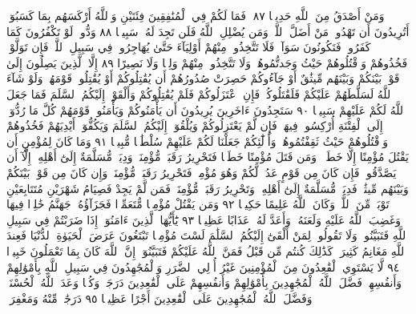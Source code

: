 وَمَنْ أَصْدَقُ مِنَ ٱللَّهِ حَدِيثࣰا ٨٧۞ فَمَا لَكُمْ فِي ٱلْمُنَٰفِقِينَ
فِئَتَيْنِ وَٱللَّهُ أَرْكَسَهُم بِمَا كَسَبُوٓا۟ۚ أَتُرِيدُونَ أَن تَهْدُوا۟ مَنْ
أَضَلَّ ٱللَّهُۖ وَمَن يُضْلِلِ ٱللَّهُ فَلَن تَجِدَ لَهُۥ سَبِيلࣰا ٨٨ وَدُّوا۟ لَوْ تَكْفُرُونَ
كَمَا كَفَرُوا۟ فَتَكُونُونَ سَوَآءࣰۖ فَلَا تَتَّخِذُوا۟ مِنْهُمْ أَوْلِيَآءَ حَتَّىٰ
يُهَاجِرُوا۟ فِي سَبِيلِ ٱللَّهِۚ فَإِن تَوَلَّوْا۟ فَخُذُوهُمْ وَٱقْتُلُوهُمْ حَيْثُ
وَجَدتُّمُوهُمْۖ وَلَا تَتَّخِذُوا۟ مِنْهُمْ وَلِيࣰّا وَلَا نَصِيرًا ٨٩ إِلَّا ٱلَّذِينَ
يَصِلُونَ إِلَىٰ قَوْمِۭ بَيْنَكُمْ وَبَيْنَهُم مِّيثَٰقٌ أَوْ جَآءُوكُمْ حَصِرَتْ
صُدُورُهُمْ أَن يُقَٰتِلُوكُمْ أَوْ يُقَٰتِلُوا۟ قَوْمَهُمْۚ وَلَوْ شَآءَ ٱللَّهُ
لَسَلَّطَهُمْ عَلَيْكُمْ فَلَقَٰتَلُوكُمْۚ فَإِنِ ٱعْتَزَلُوكُمْ فَلَمْ يُقَٰتِلُوكُمْ
وَأَلْقَوْا۟ إِلَيْكُمُ ٱلسَّلَمَ فَمَا جَعَلَ ٱللَّهُ لَكُمْ عَلَيْهِمْ سَبِيلࣰا ٩٠
سَتَجِدُونَ ءَاخَرِينَ يُرِيدُونَ أَن يَأْمَنُوكُمْ وَيَأْمَنُوا۟ قَوْمَهُمْ كُلَّ
مَا رُدُّوٓا۟ إِلَى ٱلْفِتْنَةِ أُرْكِسُوا۟ فِيهَاۚ فَإِن لَّمْ يَعْتَزِلُوكُمْ وَيُلْقُوٓا۟
إِلَيْكُمُ ٱلسَّلَمَ وَيَكُفُّوٓا۟ أَيْدِيَهُمْ فَخُذُوهُمْ وَٱقْتُلُوهُمْ حَيْثُ
ثَقِفْتُمُوهُمْۚ وَأُو۟لَٰٓئِكُمْ جَعَلْنَا لَكُمْ عَلَيْهِمْ سُلْطَٰنࣰا مُّبِينࣰا ٩١
وَمَا كَانَ لِمُؤْمِنٍ أَن يَقْتُلَ مُؤْمِنًا إِلَّا خَطَـࣰٔاۚ وَمَن قَتَلَ
مُؤْمِنًا خَطَـࣰٔا فَتَحْرِيرُ رَقَبَةࣲ مُّؤْمِنَةࣲ وَدِيَةࣱ مُّسَلَّمَةٌ
إِلَىٰٓ أَهْلِهِۦٓ إِلَّآ أَن يَصَّدَّقُوا۟ۚ فَإِن كَانَ مِن قَوْمٍ عَدُوࣲّ
لَّكُمْ وَهُوَ مُؤْمِنࣱ فَتَحْرِيرُ رَقَبَةࣲ مُّؤْمِنَةࣲۖ وَإِن كَانَ
مِن قَوْمِۭ بَيْنَكُمْ وَبَيْنَهُم مِّيثَٰقࣱ فَدِيَةࣱ مُّسَلَّمَةٌ إِلَىٰٓ
أَهْلِهِۦ وَتَحْرِيرُ رَقَبَةࣲ مُّؤْمِنَةࣲۖ فَمَن لَّمْ يَجِدْ فَصِيَامُ
شَهْرَيْنِ مُتَتَابِعَيْنِ تَوْبَةࣰ مِّنَ ٱللَّهِۗ وَكَانَ ٱللَّهُ
عَلِيمًا حَكِيمࣰا ٩٢ وَمَن يَقْتُلْ مُؤْمِنࣰا مُّتَعَمِّدࣰا
فَجَزَآؤُهُۥ جَهَنَّمُ خَٰلِدࣰا فِيهَا وَغَضِبَ ٱللَّهُ عَلَيْهِ
وَلَعَنَهُۥ وَأَعَدَّ لَهُۥ عَذَابًا عَظِيمࣰا ٩٣ يَٰٓأَيُّهَا ٱلَّذِينَ
ءَامَنُوٓا۟ إِذَا ضَرَبْتُمْ فِي سَبِيلِ ٱللَّهِ فَتَبَيَّنُوا۟ وَلَا تَقُولُوا۟
لِمَنْ أَلْقَىٰٓ إِلَيْكُمُ ٱلسَّلَٰمَ لَسْتَ مُؤْمِنࣰا تَبْتَغُونَ
عَرَضَ ٱلْحَيَوٰةِ ٱلدُّنْيَا فَعِندَ ٱللَّهِ مَغَانِمُ كَثِيرَةࣱۚ
كَذَٰلِكَ كُنتُم مِّن قَبْلُ فَمَنَّ ٱللَّهُ عَلَيْكُمْ
فَتَبَيَّنُوٓا۟ۚ إِنَّ ٱللَّهَ كَانَ بِمَا تَعْمَلُونَ خَبِيرࣰا ٩٤
لَّا يَسْتَوِي ٱلْقَٰعِدُونَ مِنَ ٱلْمُؤْمِنِينَ غَيْرُ أُو۟لِي ٱلضَّرَرِ وَٱلْمُجَٰهِدُونَ
فِي سَبِيلِ ٱللَّهِ بِأَمْوَٰلِهِمْ وَأَنفُسِهِمْۚ فَضَّلَ ٱللَّهُ ٱلْمُجَٰهِدِينَ بِأَمْوَٰلِهِمْ
وَأَنفُسِهِمْ عَلَى ٱلْقَٰعِدِينَ دَرَجَةࣰۚ وَكُلࣰّا وَعَدَ ٱللَّهُ ٱلْحُسْنَىٰۚ وَفَضَّلَ ٱللَّهُ
ٱلْمُجَٰهِدِينَ عَلَى ٱلْقَٰعِدِينَ أَجْرًا عَظِيمࣰا ٩٥ دَرَجَٰتࣲ مِّنْهُ وَمَغْفِرَةࣰ
